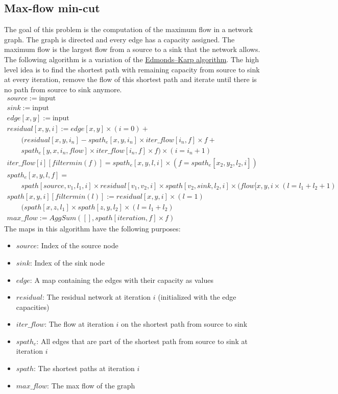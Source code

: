 \documentclass[11pt]{article}
\begin{document}
\subsection{Max-flow min-cut}
The goal of this problem is the computation of the maximum flow in a network graph.
The graph is directed and every edge has a capacity assigned.
The maximum flow is the largest flow from a source to a sink that the network allows.
The following algorithm is a variation of the \href{http://en.wikipedia.org/wiki/Edmonds%E2%80%93Karp_algorithm}{Edmonds–Karp algorithm}. 
The high level idea is to find the shortest path with remaining capacity from source to sink at every iteration, remove the flow of this shortest path and iterate until there is no path from source to sink anymore.
\[
\begin{array}{l}
source := \text{input} \\
sink := \text{input} \\
edge[x,y] := \text{input} \\
residual[x,y,i] := edge[x,y] \times (i = 0) + \\
\qquad (residual[x,y,i_n] - spath_e[x,y,i_n] \times iter\_flow[i_n,f] \times f + \\
\qquad spath_e[y,x,i_n,flow] \times iter\_flow[i_n,f] \times f) \times (i = i_n + 1)\\
iter\_flow[i][filtermin(f)] = spath_e[x,y,l,i] \times (f = spath_e[x_2,y_2,l_2,i]) \\
spath_e[x,y,l,f] = \\
\qquad spath[source,v_1,l_1,i] \times residual[v_1,v_2,i] \times spath[v_2,sink,l_2,i] \times (flow[x,y,i\times (l = l_1 + l_2 + 1) \\ 
spath[x,y,i][filtermin(l)] := residual[x,y,i] \times (l = 1) \\
\qquad (spath[x,z,l_1] \times spath[z,y,l_2] \times (l = l_1 + l_2) \\
max\_flow := AggSum([], spath[iteration, f] \times f)
\end{array}
\]
The maps in this algorithm have the following purposes:
\begin{itemize}
\item $source$: Index of the source node
\item $sink$: Index of the sink node
\item $edge$: A map containing the edges with their capacity as values
\item $residual$: The residual network at iteration $i$ (initialized with the edge capacities)
\item $iter\_flow$: The flow at iteration $i$ on the shortest path from source to sink
\item $spath_e$: All edges that are part of the shortest path from source to sink at iteration $i$
\item $spath$: The shortest paths at iteration $i$
\item $max\_flow$: The max flow of the graph 
\end{itemize}
\end{document}
